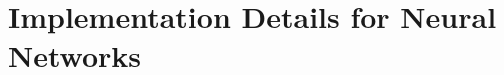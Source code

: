 \documentclass[11pt]{article}
\numberwithin{equation}{section} %
\numberwithin{figure}{section} %
\numberwithin{table}{section} %
\begin{document}

\clearpage
\appendix
\section{Implementation Details for Neural Networks}
\label{sec:implementationdetails}
\end{document}
